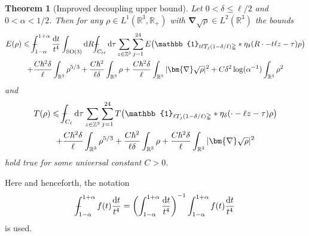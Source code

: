 \documentclass[final,onefignum,onetabnum,reqno]{amsart}
\newtheorem{theorem}{Theorem}[section]
\theoremstyle{remark}
\renewcommand{\le}{\leqslant}
\newcommand{\RR}{\mathbb{R}}
\newcommand{\ZZ}{\mathbb{Z}}
\newcommand{\SO}{\mathrm{SO}}
\newcommand{\iden}{\mathbb{1}} %
\newcommand{\grad}{\bm{\nabla}} %
\newcommand{\tetra}{\mathbb{\Delta}} %
\newcommand{\dd}{\mathrm{d}} %
\def\Xint#1{\mathchoice
{\XXint\displaystyle\textstyle{#1}}%
{\XXint\textstyle\scriptstyle{#1}}%
{\XXint\scriptstyle\scriptscriptstyle{#1}}%
{\XXint\scriptscriptstyle\scriptscriptstyle{#1}}%
\!\int}
\def\XXint#1#2#3{{\setbox0=\hbox{$#1{#2#3}{\int}$ }
\vcenter{\hbox{$#2#3$ }}\kern-.6\wd0}}
\def\dashint{\Xint-}
\begin{document}
\begin{theorem}[Improved decoupling upper bound]\label{impdecup}
Let $0<\delta\le \ell/2$ and $0<\alpha<1/2$. Then for any $\rho\in L^1(\RR^3,\RR_+)$ with $\grad\sqrt{\rho}\in L^2(\RR^3)$ the bounds
\begin{multline*}
E(\rho)\le  \dashint_{1-\alpha}^{1+\alpha}\frac{\dd t}{t^4} \int_{\SO(3)}\dd R \dashint_{C_{t\ell}}\dd\tau \sum_{z\in\ZZ^3}  \sum_{j=1}^{24} 
E\bigl(\iden_{t\ell T_j(1-\delta/\ell)\tetra} * \eta_\delta(R\cdot - t\ell z - \tau)\rho\bigr)\\
+\frac{C\hbar^2\delta}{\ell} \int_{\RR^3}\rho^{5/3} +  \frac{C\hbar^2}{\ell\delta} \int_{\RR^3} \rho + \frac{C\hbar^2\delta}{\ell}\int_{\RR^3} |\grad\sqrt{\rho}|^2
+C\delta^2\log(\alpha^{-1}) \int_{\RR^3} \rho^2
\end{multline*}
and 
\begin{multline*}
T(\rho)\le \dashint_{C_{\ell}}\dd\tau \sum_{z\in\ZZ^3}  \sum_{j=1}^{24} T\bigl(\iden_{\ell T_j(1-\delta/\ell)\tetra} * \eta_\delta(\cdot - \ell z - \tau)\rho\bigr)\\
+\frac{C\hbar^2\delta}{\ell} \int_{\RR^3}\rho^{5/3} +  \frac{C\hbar^2}{\ell\delta} \int_{\RR^3} \rho + \frac{C\hbar^2\delta}{\ell}\int_{\RR^3} |\grad\sqrt{\rho}|^2
\end{multline*}
hold true for some universal constant $C>0$.
\end{theorem}
Here and henceforth, the notation 
$$
\dashint_{1-\alpha}^{1+\alpha}f(t)\frac{\dd t}{t^4} =\left(\int_{1-\alpha}^{1+\alpha}\frac{\dd t}{t^4} \right)^{-1} \int_{1-\alpha}^{1+\alpha}f(t) \frac{\dd t}{t^4} 
$$
is used.
\end{document}
